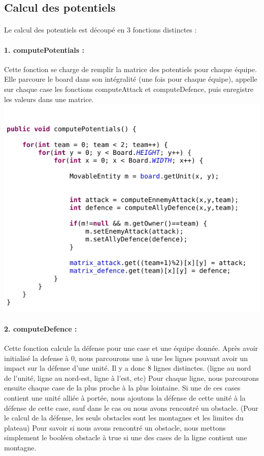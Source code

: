 		\subsection{Calcul des potentiels}
		
			\paragraph{}
			Le calcul des potentiels est découpé en 3 fonctions distinctes :
			
			\paragraph{1. computePotentials : }
			Cette fonction se charge de remplir la matrice des potentiels pour chaque équipe.
			Elle parcoure le board dans son intégralité (une fois pour chaque équipe), appelle sur chaque case les fonctions computeAttack et 
			computeDefence, puis enregistre les valeurs dans une matrice.\\
			\includegraphics[scale=0.4]{images/implementation/computePotentials.png}
			
			\paragraph{2. computeDefence : }
			Cette fonction calcule la défense pour une case et une équipe donnée.
			Après avoir initialisé la defense à 0, nous parcourons une à une les lignes pouvant avoir un impact sur la défense d'une unité.
			Il y a donc 8 lignes distinctes. (ligne au nord de l'unité, ligne au nord-est, ligne à l'est, etc)
			Pour chaque ligne, nous parcourons ensuite chaque case de la plus proche à la plus lointaine.
			Si une de ces cases contient une unité alliée à portée, nous ajoutons la défense de cette unité à la défense de cette case, 
			sauf dans le cas ou nous avons rencontré un obstacle. (Pour le calcul de la défense, les seuls obstacles sont les montagnes et les limites du plateau)
			Pour savoir si nous avons rencontré un obstacle, nous mettons simplement le booléen obstacle à true si une des cases de la 
			ligne contient une montagne.
			
